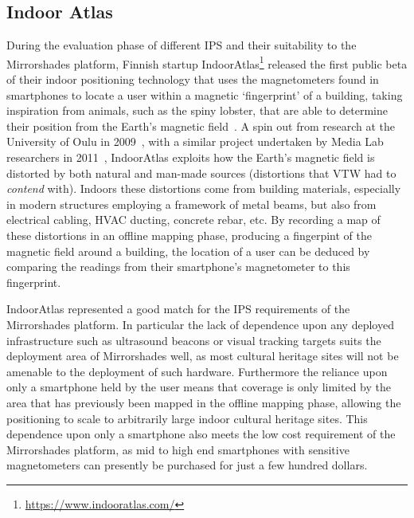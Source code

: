 
\subsection{Indoor Atlas}

During the evaluation phase of different IPS and their suitability to the Mirrorshades platform, Finnish startup IndoorAtlas\footnote{\url{https://www.indooratlas.com/}} released the first public beta of their indoor positioning technology that uses the magnetometers found in smartphones to locate a user within a magnetic `fingerprint' of a building, taking inspiration from animals, such as the spiny lobster, that are able to determine their position from the Earth's magnetic field~\cite{Boles2003}. A spin out from research at the University of Oulu in 2009~\cite{Haverinen2009,Haverinen2009a}, with a similar project undertaken by Media Lab researchers in 2011~\cite{Chung2011}, IndoorAtlas exploits how the Earth's magnetic field is distorted by both natural and man-made sources (distortions that VTW had to \textit{contend} with). Indoors these distortions come from building materials, especially in modern structures employing a framework of metal beams, but also from electrical cabling, HVAC ducting, concrete rebar, etc. By recording a map of these distortions in an offline mapping phase, producing a fingerpint of the magnetic field around a building, the location of a user can be deduced by comparing the readings from their smartphone's magnetometer to this fingerprint.

IndoorAtlas represented a good match for the IPS requirements of the Mirrorshades platform. In particular the lack of dependence upon any deployed infrastructure such as ultrasound beacons or visual tracking targets suits the deployment area of Mirrorshades well, as most cultural heritage sites will not be amenable to the deployment of such hardware. Furthermore the reliance upon only a smartphone held by the user means that coverage is only limited by the area that has previously been mapped in the offline mapping phase, allowing the positioning to scale to arbitrarily large indoor cultural heritage sites. This dependence upon only a smartphone also meets the low cost requirement of the Mirrorshades platform, as mid to high end smartphones with sensitive magnetometers can presently be purchased for just a few hundred dollars.

